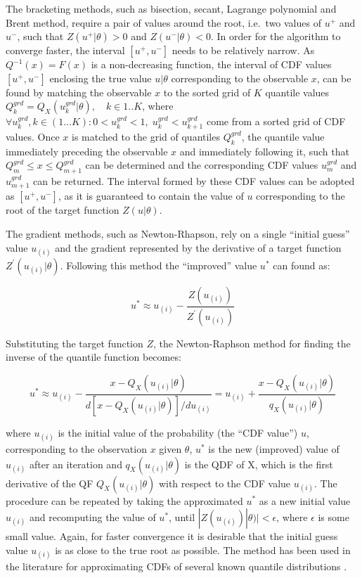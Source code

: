 \documentclass[
  12pt,
]{article}
\begin{document}
The bracketing methods, such as bisection, secant, Lagrange polynomial and Brent method, require a pair of values around the root, i.e.~two values of \(u^+\) and \(u^-\), such that \(Z(u^+|\theta)>0\) and \(Z(u^-|\theta)<0\). In order for the algorithm to converge faster, the interval \([u^+, u^-]\) needs to be relatively narrow. As \(Q^{-1}(x)=F(x)\) is a non-decreasing function, the interval of CDF values \([u^+, u^-]\) enclosing the true value \(u|\theta\) corresponding to the observable \(x\), can be found by matching the observable \(x\) to the sorted grid of \(K\) quantile values \(Q^{grd}_k=Q_X(u^{grd}_k|\theta), \quad k \in 1..K\), where \(\forall u^{grd}_k, k \in (1\dots K): 0<u^{grd}_k<1, \; u^{grd}_k<u^{grd}_{k+1}\) come from a sorted grid of CDF values. Once \(x\) is matched to the grid of quantiles \(Q^{grd}_k\), the quantile value immediately preceding the observable \(x\) and immediately following it, such that \(Q^{grd}_{m} \leq x \leq Q^{grd}_{m+1}\) can be determined and the corresponding CDF values \(u^{grd}_m\) and \(u^{grd}_{m+1}\) can be returned. The interval formed by these CDF values can be adopted as \([u^+, u^-]\), as it is guaranteed to contain the value of \(u\) corresponding to the root of the target function \(Z(u|\theta)\).

The gradient methods, such as Newton-Rhapson, rely on a single ``initial guess'' value \(u_{(i)}\) and the gradient represented by the derivative of a target function \(Z^\prime(u_{(i)}|\theta)\). Following this method the ``improved'' value \(u^*\) can found as:

\[
u^*\approx u_{(i)} -\frac{Z(u_{(i)})}{Z^\prime(u_{(i)})}
\]

Substituting the target function \(Z\), the Newton-Raphson method for finding the inverse of the quantile function becomes:

\[
u^*\approx u_{(i)}-\frac{x-Q_X(u_{(i)}|\theta)}{d[x-Q_X(u_{(i)}|\theta)]/du_{(i)}}= u_{(i)}+\frac{x-Q_X(u_{(i)}|\theta)}{q_X(u_{(i)}|\theta)}
\]

where \(u_{(i)}\) is the initial value of the probability (the ``CDF value'') \(u\), corresponding to the observation \(x\) given \(\theta\), \(u^*\) is the new (improved) value of \(u_{(i)}\) after an iteration and \(q_X(u_{(i)}|\theta)\) is the QDF of X, which is the first derivative of the QF \(Q_X(u_{(i)}|\theta)\) with respect to the CDF value \(u_{(i)}\). The procedure can be repeated by taking the approximated \(u^*\) as a new initial value \(u_{(i)}\) and recomputing the value of \(u^*\), until \(|Z(u_{(i)})|\theta)|< \epsilon\), where \(\epsilon\) is some small value. Again, for faster convergence it is desirable that the initial guess value \(u_{(i)}\) is as close to the true root as possible. The method has been used in the literature for approximating CDFs of several known quantile distributions \citetext{\citealp[see p.99 in][]{gilchrist2000StatisticalModellingQuantile}; \citealp[p.345 in][]{nair2013QuantileBasedReliabilityAnalysis}}.
\end{document}
